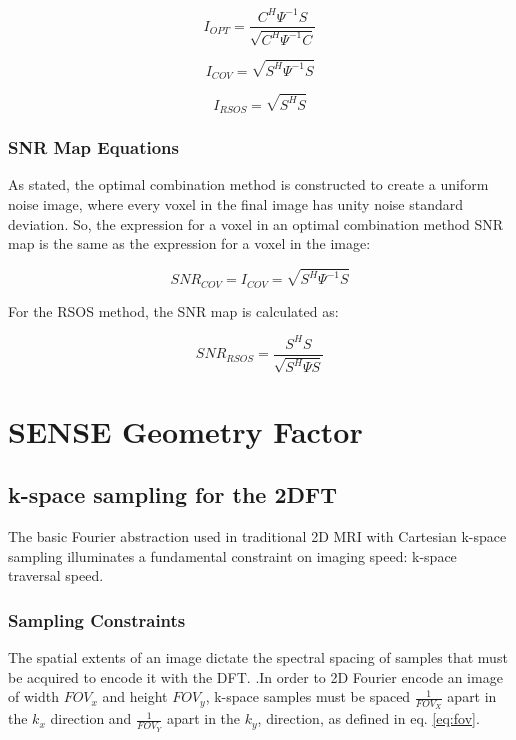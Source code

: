\begin{equation} \label{eq:I_OPT}
I_{OPT}=\frac{C^H\Psi^{-1}S}{\sqrt{C^H\Psi^{-1}C}}
\end{equation}

\begin{equation} \label{eq:I_COV}
I_{COV}=\sqrt{S^H\Psi^{-1}S}
\end{equation}

\begin{equation} \label{eq:I_RSOS}
I_{RSOS}=\sqrt{S^{H} S}
\end{equation}

\subsubsection{SNR Map Equations}

As stated, the optimal combination method is constructed to create a uniform noise image, where every voxel in the final
image has unity noise standard deviation. So, the expression for a voxel in an optimal combination method SNR map is the
same as the expression for a voxel in the image:

\begin{equation} \label{eq:SNR_COV}
    SNR_{COV}= I_{COV} = \sqrt{S^H\Psi^{-1}S}
\end{equation}

For the RSOS method, the SNR map is calculated as:

\begin{equation} \label{eq:SNR_COV}
    SNR_{RSOS}= \frac{S^HS}{\sqrt{S^H \Psi S}}
\end{equation}


\section{SENSE Geometry Factor}

\subsection{k-space sampling for the 2DFT}
The basic Fourier abstraction used in traditional 2D MRI with Cartesian k-space sampling illuminates a fundamental
constraint on imaging speed: k-space traversal speed.

\subsubsection{Sampling Constraints}
The spatial extents of an image dictate the spectral spacing of samples that must be acquired to encode it with the DFT.
\cite{nishimura} .In order to 2D Fourier encode an image of width $FOV_x$ and height $FOV_y$, k-space samples must be
spaced $\frac{1}{FOV_X}$ apart in the $k_x$ direction and $\frac{1}{FOV_Y}$ apart in the $k_y$, direction, as defined in
eq. \ref{eq:fov}.

